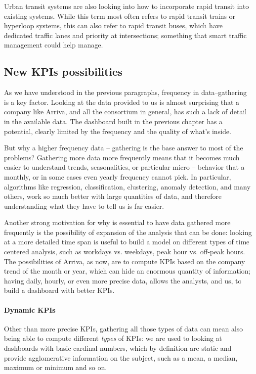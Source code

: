 Urban transit systems are also looking into how to incorporate rapid transit into existing systems. While this term most often refers to rapid transit trains or hyperloop systems, this can also refer to rapid transit buses, which have dedicated traffic lanes and priority at intersections; something that smart traffic management could help manage.


\subsection{New KPIs possibilities}
\label{subsec:newpossibilities}
As we have understood in the previous paragraphs, frequency in data–gathering is a key factor. Looking at the data provided to us is almost surprising that a company like Arriva, and all the consortium in general, has such a lack of detail in the available data. The dashboard built in the previous chapter has a potential, clearly limited by the frequency and the quality of what’s inside.

But why a higher frequency data – gathering is the base answer to most of the problems? Gathering more data more frequently means that it becomes much easier to understand trends, seasonalities, or particular micro – behavior that a monthly, or in some cases even yearly frequency cannot pick. In particular, algorithms like regression, classification, clustering, anomaly detection, and many others, work so much better with large quantities of data, and therefore understanding what they have to tell us is far easier.

Another strong motivation for why is essential to have data gathered more frequently is the possibility of expansion of the analysis that can be done: looking at a more detailed time span is useful to build a model on different types of time centered analysis, such as workdays vs. weekdays, peak hour vs. off-peak hours. The possibilities of Arriva, as now, are to compute KPIs based on the company trend of the month or year, which can hide an enormous quantity of information; having daily, hourly, or even more precise data, allows the analysts, and us, to build a dashboard with better KPIs.

\paragraph{Dynamic KPIs}
Other than more precise KPIs, gathering all those types of data can mean also being able to compute different \textit{types} of KPIs: we are used to looking at dashboards with basic cardinal numbers, which by definition are static and provide agglomerative information on the subject, such as a mean, a median, maximum or minimum and so on. 


